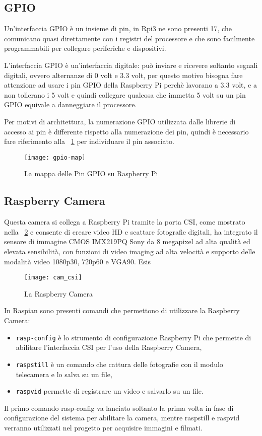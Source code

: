 \subsection{GPIO}
Un’interfaccia GPIO è un insieme di pin, in Rpi3 ne sono presenti 17, che comunicano quasi direttamente con i registri del processore e che sono facilmente programmabili per collegare periferiche e dispositivi.

L’interfaccia GPIO è un’interfaccia digitale: può inviare e ricevere soltanto segnali digitali, ovvero alternanze di 0 volt e 3.3 volt, per questo motivo bisogna fare attenzione ad usare i pin GPIO della Raspberry Pi perchè  lavorano a 3.3 volt, e a non tollerano i 5 volt e quindi collegare qualcosa che immetta 5 volt su un pin GPIO equivale a danneggiare il processore.

Per motivi di architettura, la numerazione GPIO utilizzata dalle librerie di accesso ai pin è differente rispetto alla numerazione dei pin, quindi è necessario fare riferimento alla \figurename~\ref{fig:gpio-map}
per individuare il pin associato.



\begin{figure}[htbp!] 
	\centering    
	\texttt{[image: gpio-map]}
	\caption[Mappa GPIO]{La mappa delle Pin GPIO su Raspberry Pi}
	\label{fig:gpio-map}
\end{figure}


\subsection{Raspberry Camera}
Questa camera si collega a Raspberry Pi tramite la porta CSI, come mostrato nella \figurename~\ref{fig:camera} e consente di creare video HD e scattare fotografie digitali, ha integrato il sensore di immagine CMOS IMX219PQ Sony da 8 megapixel ad alta qualità ed elevata sensibilità, con funzioni di video imaging ad alta velocità e supporto delle modalità video 1080p30, 720p60 e VGA90.
Esis
\begin{figure}[htbp!] 
	\centering    
	\texttt{[image: cam\_csi]}
	\caption[Raspberry Camera]{La Raspberry Camera}
	\label{fig:camera}
\end{figure}
In Raspian sono presenti comandi che permettono di utilizzare la Raspberry Camera:
\begin{itemize}
	\item \texttt{rasp-config} è lo strumento di configurazione  Raspberry Pi che permette di abilitare l'interfaccia CSI per l'uso della Raspberry Camera,
	\item \texttt{raspstill} è un comando che cattura delle fotografie con il modulo telecamera e lo salva su un file,
	\item \texttt{raspvid} permette di registrare un video e salvarlo su un file.
\end{itemize}
Il primo comando rasp-config va lanciato soltanto la prima volta in fase di configurazione del sistema per abilitare la camera, mentre raspstill e raspvid verranno utilizzati nel progetto per acquisire immagini e filmati.

